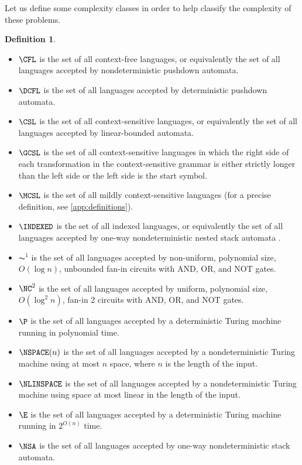 \documentclass{article}
\theoremstyle{definition}
\newtheorem{definition}{Definition}
\begin{document}
Let us define some complexity classes in order to help classify the complexity of these problems.
\begin{definition}\mbox{}
  \begin{itemize}
  \item $\CFL$ is the set of all context-free languages, or equivalently the set of all languages accepted by nondeterministic pushdown automata.
  \item $\DCFL$ is the set of all languages accepted by deterministic pushdown automata.
  \item $\CSL$ is the set of all context-sensitive languages, or equivalently the set of all languages accepted by linear-bounded automata.
  \item $\GCSL$ is the set of all context-sensitive languages in which the right side of each transformation in the context-sensitive grammar is either strictly longer than the left side or the left side is the start symbol.
  \item $\MCSL$ is the set of all mildly context-sensitive languages (for a precise definition, see \autoref{app:definitions}).
  \item $\INDEXED$ is the set of all indexed languages, or equivalently the set of all languages accepted by one-way nondeterministic nested stack automata \cite{aho}.
  \item $\AC^1$ is the set of all languages accepted by non-uniform, polynomial size, $O(\log n)$, unbounded fan-in circuits with AND, OR, and NOT gates.
  \item $\NC^2$ is the set of all languages accepted by uniform, polynomial size, $O(\log^2 n)$, fan-in 2 circuits with AND, OR, and NOT gates.
  \item $\P$ is the set of all languages accepted by a deterministic Turing machine running in polynomial time.
  \item $\NSPACE(n)$ is the set of all languages accepted by a nondeterministic Turing machine using at most $n$ space, where $n$ is the length of the input.
  \item $\NLINSPACE$ is the set of all languages accepted by a nondeterministic Turing machine using space at most linear in the length of the input.
  \item $\E$ is the set of all languages accepted by a deterministic Turing machine running in $2^{O(n)}$ time.
  \item $\NSA$ is the set of all languages accepted by one-way nondeterministic stack automata.
  \end{itemize}
\end{definition}
\end{document}
